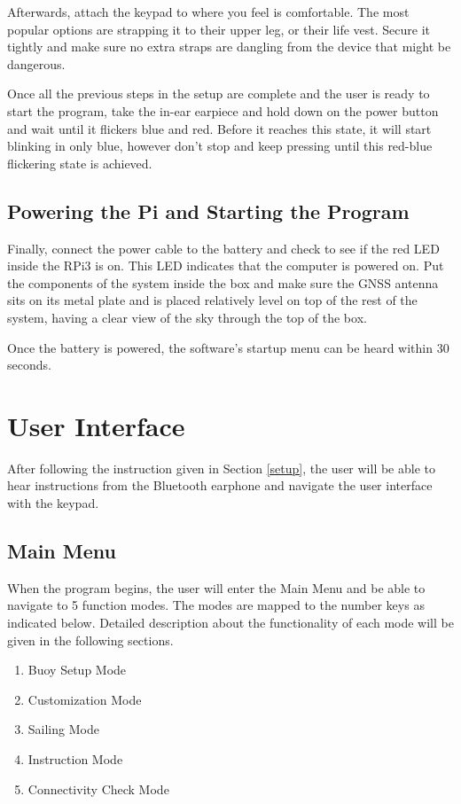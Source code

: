 \documentclass[11pt]{article}
\begin{document}
Afterwards, attach the keypad to where you feel is comfortable. The most popular options are strapping it to their upper leg, or their life vest. Secure it tightly and make sure no extra straps are dangling from the device that might be dangerous.

Once all the previous steps in the setup are complete and the user is ready to start the program, take the in-ear earpiece and hold down on the power button and wait until it flickers blue and red. Before it reaches this state, it will start blinking in only blue, however don't stop and keep pressing until this red-blue flickering state is achieved.

\subsection{Powering the Pi and Starting the Program}

Finally, connect the power cable to the battery and check to see if the red LED inside the RPi3 is on. This LED indicates that the computer is powered on. Put the components of the system inside the box and make sure the GNSS antenna sits on its metal plate and is placed relatively level on top of the rest of the system, having a clear view of the sky through the top of the box.

Once the battery is powered, the software's startup menu can be heard within 30 seconds.

\pagebreak

\section{User Interface} \label{ui}
After following the instruction given in Section \ref{setup}, the user will be able to hear instructions from the Bluetooth earphone and navigate the user interface with the keypad.

\subsection{Main Menu}
When the program begins, the user will enter the Main Menu and be able to navigate to 5 function modes. The modes are mapped to the number keys as indicated below. Detailed description about the functionality of each mode will be given in the following sections.

\begin{enumerate}
\item Buoy Setup Mode
\item Customization Mode
\item Sailing Mode
\item Instruction Mode
\item Connectivity Check Mode
\end{enumerate}
\end{document}
